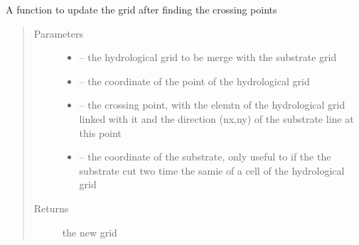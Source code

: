 \documentclass[letterpaper,10pt,english]{sphinxmanual}
\begin{document}
\begin{fulllineitems}
\label{\detokenize{index:src.substrate.grid_update_sub3}}
A function to update the grid after finding the crossing points
\begin{quote}\begin{description}
\item[{Parameters}] \leavevmode\begin{itemize}
\item {} 
 -- the hydrological grid to be merge with the substrate grid

\item {} 
 -- the coordinate of the point of the hydrological grid

\item {} 
 -- the crossing point, with the elemtn of the hydrological grid linked with it and the
direction (nx,ny) of the substrate line at this point

\item {} 
 -- the coordinate of the substrate, only useful to if the the substrate cut two time the samie of a
cell of the hydrological grid

\end{itemize}

\item[{Returns}] \leavevmode
the new grid

\end{description}\end{quote}

\end{fulllineitems}

\end{document}
